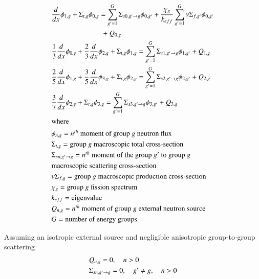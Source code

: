 \documentclass{anstrans}
\begin{document}
\begin{align}
    & \frac{d}{dx} \phi_{1,g} + \Sigma_{t,g} \phi_{0,g} = \sum_{g'=1}^G \Sigma_{s0,g' \rightarrow g} \phi_{0,g'} + \frac{\chi_g}{k_{eff}} \sum_{g'=1}^G \nu\Sigma_{f,g'} \phi_{0,g'} \notag \\ & \quad \quad \quad \quad \quad \quad \quad + Q_{0,g}  \label{eq:P3-0} \\
    & \frac{1}{3} \frac{d}{dx} \phi_{0,g} + \frac{2}{3}\frac{d}{dx}\phi_{2,g} + \Sigma_{t,g} \phi_{1,g} = \sum_{g'=1}^G \Sigma_{s1,g' \rightarrow g} \phi_{1,g'} + Q_{1,g} \label{eq:P3-1} \\
    & \frac{2}{5} \frac{d}{dx}\phi_{1,g} + \frac{3}{5}\frac{d}{dx}\phi_{3,g} + \Sigma_{t,g} \phi_{2,g} = \sum_{g'=1}^G \Sigma_{s2,g' \rightarrow g} \phi_{2,g'} + Q_{2,g} \label{eq:P3-2} \\
    & \frac{3}{7}\frac{d}{dx}\phi_{2,g} + \Sigma_{t,g} \phi_{3,g} = \sum_{g'=1}^G \Sigma_{s3,g' \rightarrow g} \phi_{3,g'} + Q_{3,g} \label{eq:P3-3} \\
    \intertext{where}
    & \phi_{n,g} = \mbox{$n^{th}$ moment of group $g$ neutron flux}  \notag \\ %
    & \Sigma_{t,g} = \mbox{group $g$ macroscopic total cross-section}  \notag \\ %
	& \Sigma_{sn,g' \rightarrow g} = \mbox{$n^{th}$ moment of the group $g'$ to group $g$} \notag \\
	& \mbox{macroscopic scattering cross-section}  \notag \\ %
	& \nu\Sigma_{f,g} = \mbox{group $g$ macroscopic production cross-section}  \notag \\ %
	& \chi_{g} = \mbox{group $g$ fission spectrum}  \notag \\ %
	& k_{eff} = \mbox{eigenvalue}  \notag \\ %
	& Q_{n,g} = \mbox{$n^{th}$ moment of group $g$ external neutron source}  \notag \\  %
	& G = \mbox{number of energy groups}.  \notag %
\end{align}

Assuming an isotropic external source and negligible anisotropic group-to-group scattering \cite{brantley_simplifiedP3_2000}
\begin{align}
	& Q_{n,g} = 0, \quad n > 0 \notag \\
	& \Sigma_{sn,g' \rightarrow g} = 0, \quad g' \ne g, \quad n > 0 \notag
\end{align}
\end{document}
